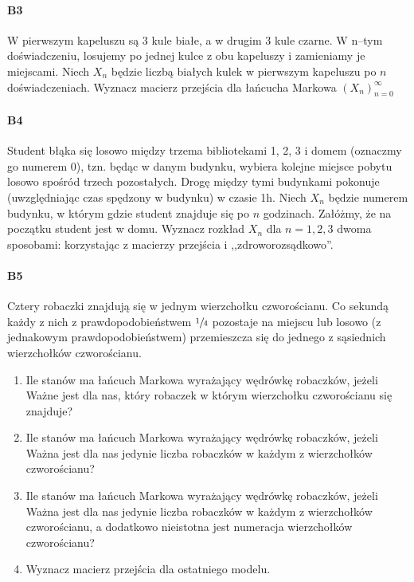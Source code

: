 \paragraph{B3} W pierwszym kapeluszu są 3 kule białe, a w drugim 3 kule czarne. W n–tym doświadczeniu, losujemy po jednej kulce z obu kapeluszy i zamieniamy je miejscami. Niech $X_n$ będzie liczbą białych kulek w pierwszym kapeluszu po $n$ doświadczeniach. Wyznacz macierz przejścia dla łańcucha Markowa $(X_n)^\infty_{n=0}$

\paragraph{B4} Student błąka się losowo między trzema bibliotekami 1, 2, 3 i domem (oznaczmy go numerem 0), tzn. będąc w danym budynku, wybiera kolejne miejsce pobytu losowo spośród trzech pozostałych. Drogę między tymi budynkami pokonuje (uwzględniając czas spędzony w budynku) w czasie 1h. Niech $X_n$ będzie numerem budynku, w którym gdzie student znajduje się po $n$ godzinach. Załóżmy, że na początku student jest w domu. Wyznacz rozkład $X_n$ dla $n = 1, 2, 3$ dwoma sposobami: korzystając z macierzy przejścia i ,,zdroworozsądkowo”.

\paragraph{B5} Cztery robaczki znajdują się w jednym wierzchołku czworościanu. Co sekundą każdy z nich z prawdopodobieństwem $\sfrac{1}{4}$ pozostaje na miejscu lub losowo (z jednakowym prawdopodobieństwem) przemieszcza się do jednego z sąsiednich wierzchołków czworościanu.
\begin{enumerate}[label=\alph*)]
\item Ile stanów ma łańcuch Markowa wyrażający wędrówkę robaczków, jeżeli Ważne jest dla nas, który robaczek w którym wierzchołku czworościanu się znajduje?
\item Ile stanów ma łańcuch Markowa wyrażający wędrówkę robaczków, jeżeli Ważna jest dla nas jedynie liczba robaczków w każdym z wierzchołków czworościanu?
\item Ile stanów ma łańcuch Markowa wyrażający wędrówkę robaczków, jeżeli Ważna jest dla nas jedynie liczba robaczków w każdym z wierzchołków czworościanu, a dodatkowo nieistotna jest numeracja wierzchołków czworościanu?
\item Wyznacz macierz przejścia dla ostatniego modelu.
\end{enumerate}

